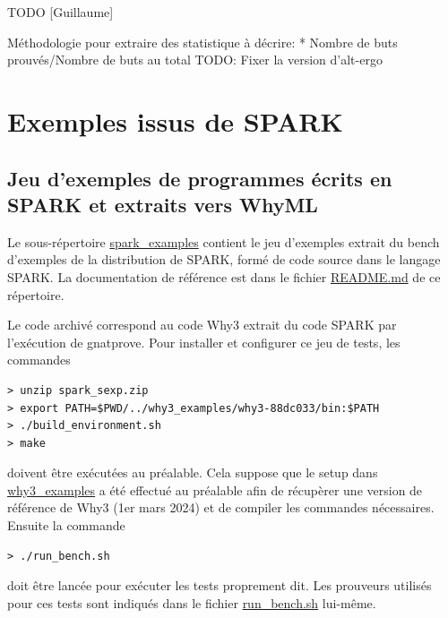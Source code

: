 \documentclass[a4paper,11pt]{article}
\begin{document}
TODO [Guillaume]

Méthodologie pour extraire des statistique à décrire:
* Nombre de buts prouvés/Nombre de buts au total
TODO: Fixer la version d'alt-ergo

\section{Exemples issus de SPARK}

\subsection{Jeu d'exemples de programmes écrits en SPARK et extraits vers WhyML}

Le sous-répertoire \url{spark_examples} contient le jeu d'exemples extrait du
bench d'exemples de la distribution de SPARK, formé de code source dans le
langage SPARK. La documentation de référence est dans le fichier
\url{README.md} de ce répertoire.

Le code archivé correspond au code Why3 extrait du code SPARK par l'exécution
de gnatprove. Pour installer et configurer ce jeu de tests, les commandes
\begin{lstlisting}
> unzip spark_sexp.zip
> export PATH=$PWD/../why3_examples/why3-88dc033/bin:$PATH  
> ./build_environment.sh
> make
\end{lstlisting}
doivent être exécutées au préalable. Cela suppose que le setup dans \url{why3_examples}
a été effectué au préalable afin de récupèrer une version de
référence de Why3 (1er mars 2024) et de compiler les commandes nécessaires. Ensuite la commande
\begin{lstlisting}
> ./run_bench.sh
\end{lstlisting}
doit être lancée pour exécuter les tests proprement dit. Les prouveurs
utilisés pour ces tests sont indiqués dans le fichier
\url{run_bench.sh} lui-même.
\end{document}
